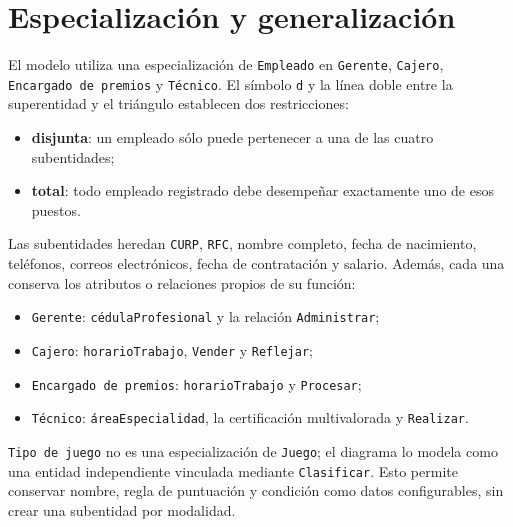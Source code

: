 \section{Especialización y generalización}

El modelo utiliza una especialización de \texttt{Empleado} en
\texttt{Gerente}, \texttt{Cajero}, \texttt{Encargado de premios} y
\texttt{Técnico}. El símbolo \texttt{d} y la línea doble entre la
superentidad y el triángulo establecen dos restricciones:

\begin{itemize}[leftmargin=*]
  \item \textbf{disjunta}: un empleado sólo puede pertenecer a una de las
        cuatro subentidades;
  \item \textbf{total}: todo empleado registrado debe desempeñar exactamente
        uno de esos puestos.
\end{itemize}

Las subentidades heredan \texttt{CURP}, \texttt{RFC}, nombre completo, fecha
de nacimiento, teléfonos, correos electrónicos, fecha de contratación y
salario. Además, cada una conserva los atributos o relaciones propios de su
función:

\begin{itemize}[leftmargin=*]
  \item \texttt{Gerente}: \texttt{cédulaProfesional} y la relación
        \texttt{Administrar};
  \item \texttt{Cajero}: \texttt{horarioTrabajo}, \texttt{Vender} y
        \texttt{Reflejar};
  \item \texttt{Encargado de premios}: \texttt{horarioTrabajo} y
        \texttt{Procesar};
  \item \texttt{Técnico}: \texttt{áreaEspecialidad}, la certificación
        multivalorada y \texttt{Realizar}.
\end{itemize}

\texttt{Tipo de juego} no es una especialización de \texttt{Juego}; el
diagrama lo modela como una entidad independiente vinculada mediante
\texttt{Clasificar}. Esto permite conservar nombre, regla de puntuación y
condición como datos configurables, sin crear una subentidad por modalidad.
